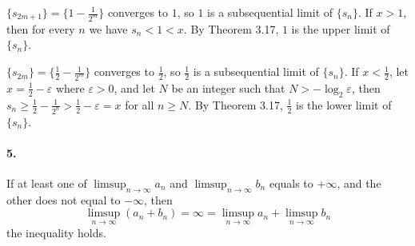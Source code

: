 \documentclass[a4paper]{article}
\begin{document}
$\{s_{2m+1}\}=\{1-\frac{1}{2^m}\}$ converges to $1$, so $1$ is a subsequential limit of $\{s_n\}$. If $x>1$, then for every $n$ we have $s_n<1<x$. By Theorem 3.17, $1$ is the upper limit of $\{s_n\}$.

$\{s_{2m}\}=\{\frac{1}{2}-\frac{1}{2^m}\}$ converges to $\frac{1}{2}$, so $\frac{1}{2}$ is a subsequential limit of $\{s_n\}$. If $x<\frac{1}{2}$, let $x=\frac{1}{2}-\varepsilon$ where $\varepsilon>0$, and let $N$ be an integer such that $N>-\log_2\varepsilon$, then $s_n\geq\frac{1}{2}-\frac{1}{2^n}>\frac{1}{2}-\varepsilon=x$ for all $n\geq N$. By Theorem 3.17, $\frac{1}{2}$ is the lower limit of $\{s_n\}$.

\paragraph{5.}
If at least one of  $\limsup_{n\to\infty}a_n$ and $\limsup_{n\to\infty}b_n$ equals to $+\infty$, and the other does not equal to $-\infty$, then 
\[
\limsup_{n\to\infty}(a_n+b_n)=\infty=\limsup_{n\to\infty}a_n+\limsup_{n\to\infty}b_n
\]
the inequality holds.
\end{document}
